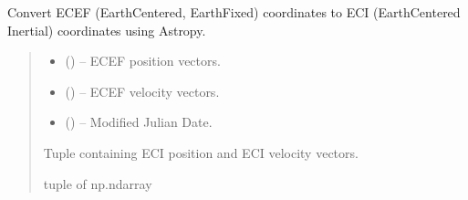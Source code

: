 \documentclass[letterpaper,10pt,english]{sphinxmanual}
\begin{document}
\begin{fulllineitems}
\label{\detokenize{fspsim.utils:fspsim.utils.Conversions.ecef2eci_astropy}}
\pysigstartsignatures
{}
\pysigstopsignatures
\sphinxAtStartPar
Convert ECEF (Earth\sphinxhyphen{}Centered, Earth\sphinxhyphen{}Fixed) coordinates to ECI (Earth\sphinxhyphen{}Centered Inertial) coordinates using Astropy.
\begin{quote}\begin{description}
\begin{itemize}
\item {} 
\sphinxAtStartPar
{} () – ECEF position vectors.

\item {} 
\sphinxAtStartPar
{} () – ECEF velocity vectors.

\item {} 
\sphinxAtStartPar
{} () – Modified Julian Date.

\end{itemize}

\sphinxAtStartPar
Tuple containing ECI position and ECI velocity vectors.

\sphinxAtStartPar
tuple of np.ndarray

\end{description}\end{quote}

\end{fulllineitems}

\end{document}

